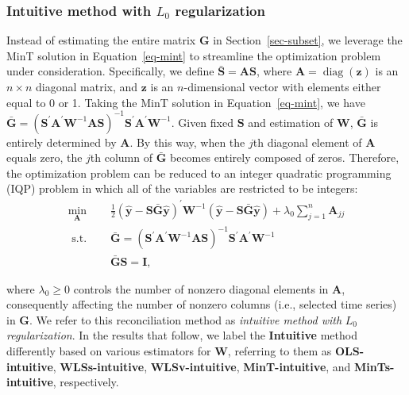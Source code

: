 \documentclass[11pt,a4paper,]{article}
\begin{document}
\hypertarget{sec-intuitive}{%
\subsubsection{\texorpdfstring{Intuitive method with \(L_0\)
regularization}{Intuitive method with L\_0 regularization}}\label{sec-intuitive}}

Instead of estimating the entire matrix \(\boldsymbol{G}\) in
Section~\ref{sec-subset}, we leverage the MinT solution in
Equation~\ref{eq-mint} to streamline the optimization problem under
consideration. Specifically, we define
\(\bar{\boldsymbol{S}} = \boldsymbol{A}\boldsymbol{S}\), where
\(\boldsymbol{A} = \operatorname{diag}(\boldsymbol{z})\) is an
\(n \times n\) diagonal matrix, and \(\boldsymbol{z}\) is an
\(n\)-dimensional vector with elements either equal to 0 or 1. Taking
the MinT solution in Equation~\ref{eq-mint}, we have
\(\bar{\boldsymbol{G}} = (\boldsymbol{S}^{\prime}\boldsymbol{A}^{\prime}\boldsymbol{W}^{-1}\boldsymbol{A}\boldsymbol{S})^{-1}\boldsymbol{S}^{\prime}\boldsymbol{A}^{\prime}\boldsymbol{W}^{-1}\).
Given fixed \(\boldsymbol{S}\) and estimation of \(\boldsymbol{W}\),
\(\bar{\boldsymbol{G}}\) is entirely determined by \(\boldsymbol{A}\).
By this way, when the \(j\)th diagonal element of \(\boldsymbol{A}\)
equals zero, the \(j\)th column of \(\bar{\boldsymbol{G}}\) becomes
entirely composed of zeros. Therefore, the optimization problem can be
reduced to an integer quadratic programming (IQP) problem in which all
of the variables are restricted to be integers: \[
\begin{aligned}
\min _{\boldsymbol{A}} \quad & \frac{1}{2}\left(\hat{\boldsymbol{y}}-\boldsymbol{S}\bar{\boldsymbol{G}}\hat{\boldsymbol{y}}\right)^{\prime} \boldsymbol{W}^{-1}\left(\hat{\boldsymbol{y}}-\boldsymbol{S}\bar{\boldsymbol{G}}\hat{\boldsymbol{y}}\right) + \lambda_0 \sum_{j=1}^n \boldsymbol{A}_{jj} \\
\text { s.t. } \quad & \bar{\boldsymbol{G}} = (\boldsymbol{S}^{\prime}\boldsymbol{A}^{\prime}\boldsymbol{W}^{-1}\boldsymbol{A}\boldsymbol{S})^{-1}\boldsymbol{S}^{\prime}\boldsymbol{A}^{\prime}\boldsymbol{W}^{-1} \\
& \bar{\boldsymbol{G}}\boldsymbol{S} = \boldsymbol{I},
\end{aligned}
\]

where \(\lambda_0 \geq 0\) controls the number of nonzero diagonal
elements in \(\boldsymbol{A}\), consequently affecting the number of
nonzero columns (i.e., selected time series) in \(\boldsymbol{G}\). We
refer to this reconciliation method as \emph{intuitive method with}
\(L_0\) \emph{regularization}. In the results that follow, we label the
\textbf{Intuitive} method differently based on various estimators for
\(\boldsymbol{W}\), referring to them as \textbf{OLS-intuitive},
\textbf{WLSs-intuitive}, \textbf{WLSv-intuitive},
\textbf{MinT-intuitive}, and \textbf{MinTs-intuitive}, respectively.
\end{document}
